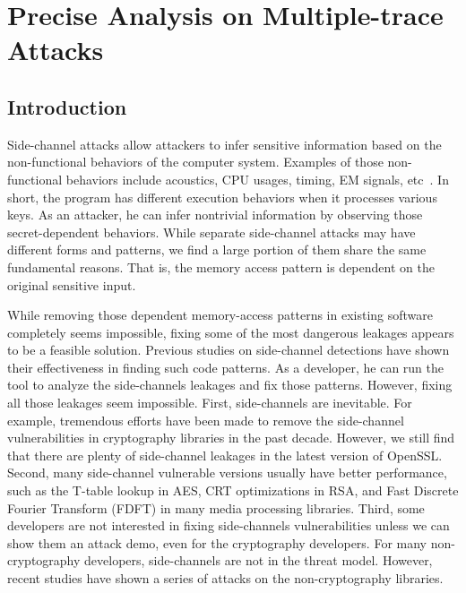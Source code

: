 
\chapter{Precise Analysis on Multiple-trace Attacks}\label{chapter5}
\section{Introduction}
Side-channel attacks allow attackers to infer sensitive information based on the non-functional behaviors of the computer system. Examples of those non-functional behaviors include acoustics, CPU usages, timing, EM signals, etc~\cite{agrawal2002side,hund2013practical,halevi2015keyboard}. In short, the program has different execution behaviors when it processes various keys. As an attacker, he can infer nontrivial information by observing those secret-dependent behaviors. While separate side-channel attacks may have different forms and patterns, we find a large portion of them share the same fundamental reasons. That is, the memory access pattern is dependent on the original sensitive input.

While removing those dependent memory-access patterns in existing software completely seems impossible, fixing some of the most dangerous leakages appears to be a feasible solution. Previous studies on side-channel detections have shown their effectiveness in finding such code patterns. As a developer, he can run the tool to analyze the side-channels leakages and fix those patterns. However, fixing all those leakages seem impossible. First, side-channels are inevitable. For example, tremendous efforts have been made to remove the side-channel vulnerabilities in cryptography libraries in the past decade. However, we still find that there are plenty of side-channel leakages in the latest version of OpenSSL. Second, many side-channel vulnerable versions usually have better performance, such as the T-table lookup in AES, CRT optimizations in RSA, and Fast Discrete Fourier Transform (FDFT) in many media processing libraries. Third, some developers are not interested in fixing side-channels vulnerabilities unless we can show them an attack demo, even for the cryptography developers. For many non-cryptography developers, side-channels are not in the threat model. However, recent studies have shown a series of attacks on the non-cryptography libraries.

